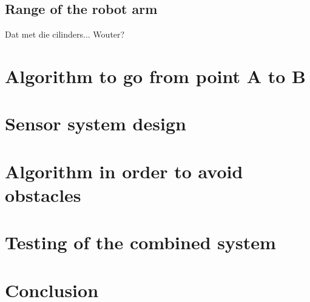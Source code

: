 \documentclass[a4paper,11pt,oneside,onecolumn]{article}
\begin{document}
\subsection{Range of the robot arm}

Dat met die cilinders... Wouter?
\section{Algorithm to go from point A to B}

\section{Sensor system design}

\section{Algorithm in order to avoid obstacles}

\section{Testing of the combined system}

\section{Conclusion}
\end{document}
